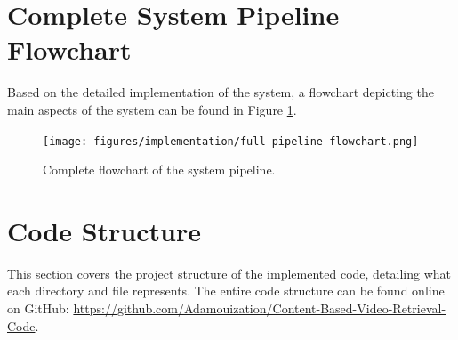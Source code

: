 \section{Complete System Pipeline Flowchart}

Based on the detailed implementation of the system, a flowchart depicting the main aspects of the system can be found in Figure \ref{fig:CBVR-flowchart}.

\begin{figure}[h] 
\centerline{\texttt{[image: figures/implementation/full-pipeline-flowchart.png]}}
\caption{\label{fig:CBVR-flowchart}Complete flowchart of the system pipeline.}
\end{figure}


\section{Code Structure}

This section covers the project structure of the implemented code, detailing what each directory and file represents. The entire code structure can be found online on GitHub: \url{https://github.com/Adamouization/Content-Based-Video-Retrieval-Code}.

